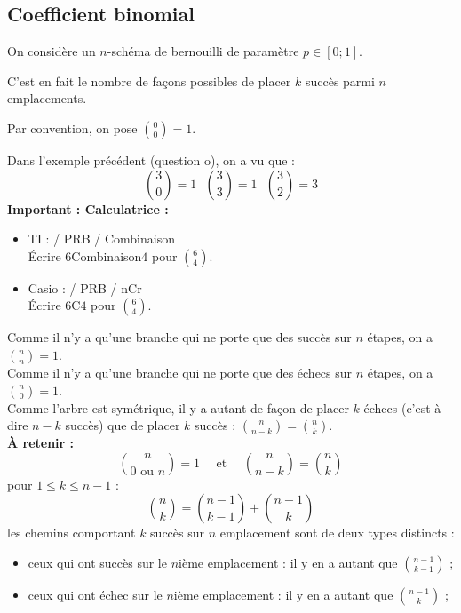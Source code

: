 \documentclass[a4paper,11pt]{article} \usepackage{FBarticle} \mapage{831}{Probabilités 1} %
\begin{document}
\begin{multicols}{2}
\par
{}

\subsection{Coefficient binomial}
On considère un $n$-schéma de bernouilli de paramètre $p\in[0;1]$.\\
\par
\rema C'est en fait le nombre de façons possibles de placer $k$ succès parmi $n$ emplacements.\par
\rema Par convention, on pose ${0\choose0}=1$.\par
\exem Dans l'exemple précédent (question o), on a vu que :
$${3\choose0}=1~~~{3\choose3}=1~~~{3\choose2}=3$$
\textbf{Important : Calculatrice : }
\begin{itemize}
\item TI :  / PRB / Combinaison\\
Écrire $6$Combinaison$4$ pour $6\choose4$.
\item Casio :  / PRB / nCr \\
Écrire $6$C$4$ pour $6\choose4$.
\end{itemize}\par
\prop Comme il n'y a qu'une branche qui ne porte que des succès sur $n$ étapes, on a ${n\choose n}=1$.\\
Comme il n'y a qu'une branche qui ne porte que des échecs sur $n$ étapes, on a ${n\choose 0}=1$.\\
Comme l'arbre est symétrique, il y a autant de façon de placer $k$ échecs (c'est à dire $n-k$ succès) que de placer $k$ succès : ${n \choose {n-k}}={n\choose k}$.\\
\textbf{À retenir :}
$${n\choose 0\textrm{~ou~}n}=1~~~~~~\textrm{et}~~~~~~{n \choose {n-k}}={n\choose k}$$
\prop pour $1\leq k\leq n-1$ :
$${n\choose k}={{n-1}\choose {k-1}}+{{n-1}\choose k}$$
\demo les chemins comportant $k$ succès sur $n$ emplacement sont de deux types distincts :
\begin{itemize}
\item ceux qui ont succès sur le $n$ième emplacement : il y en a autant que $\displaystyle{{n-1}\choose {k-1}}$ ;
\item ceux qui ont échec sur le $n$ième emplacement : il y en a autant que $\displaystyle{{n-1}\choose k}$ ;
\end{itemize}


\end{multicols}
\end{document}
